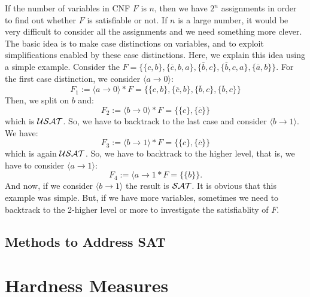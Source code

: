 \documentclass[12pt]{book}
\begin{document}
\begin{examp}\label{exp:bdd}
If the number of variables in CNF $F$ is $n$, then we have $2^n$ assignments in order to find out whether $F$ is satisfiable or not.
If $n$ is a large number, it would be very difficult to consider all the assignments and we need something more clever.
The basic idea is to make case distinctions on variables, and to exploit simplifications enabled by these case distinctions.
Here, we explain this idea using a simple example. Consider the $F = \{ \{c,b\}, \{\overline{c},b,a\}, \{\overline{b},c\}, \{\overline{b},c,a\}, \{{\overline{a},b}\} \}$. 
For the first case distinction, we consider $\langle a \to 0 \rangle$:
$$ F_1 := \langle a \to 0 \rangle * F = \{ \{c,b\}, \{\overline{c},b\}, \{\overline{b},c\}, \{\overline{b},c\} \}$$
Then, we split on $b$ and:
$$ F_2 := \langle b \to 0 \rangle * F = \{ \{c\}, \{\overline{c}\} \}$$
which is $\mathcal{USAT}$. So, we have to backtrack to the last case and consider $\langle b \to 1 \rangle$. We have:
$$ F_3 := \langle b \to 1 \rangle * F = \{ \{c\}, \{\overline{c}\} \}$$
which is again $\mathcal{USAT}$. So, we have to backtrack to the higher level, that is, we have to consider $\langle a \to 1 \rangle$:
$$ F_4 := \langle a \to 1 * F = \{ \{b\} \}.$$
And  now, if we consider $\langle b \to 1 \rangle$ the result is $\mathcal{SAT}$. It is obvious that this example was simple. But, if we have more variables, 
sometimes we need to backtrack to the 2-higher level or more to investigate the satisfiablity of $F$.
\end{examp}
\section{Methods to Address SAT}
\label{sec:Methods to Address SAT}


\chapter{Hardness Measures}
\label{cha:Hardness Measures}
\end{document}
